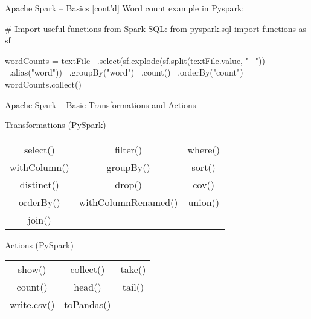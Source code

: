 \documentclass[ignorenonframetext,xcolor=x11names]{beamer}
\begin{document}


\begin{frame}[fragile]{Apache Spark -- Basics \small [cont'd]}
Word count example in Pyspark:
\begin{pythoncode}
# Import useful functions from Spark SQL:
from pyspark.sql import functions as sf

wordCounts = textFile \
    .select(sf.explode(sf.split(textFile.value, "\s+")) \
        .alias("word")) \
    .groupBy("word") \
    .count() \
    .orderBy("count")
wordCounts.collect()
\end{pythoncode}
\end{frame}

\begin{frame}{Apache Spark -- Basic Transformations and Actions}
\begin{block}{Transformations (PySpark)}
\centering
\renewcommand{\arraystretch}{1.5}
\begin{tabular}{ccc} 
select() & filter() & where() \\
withColumn() & groupBy() & sort() \\
distinct() & drop() & cov() \\
orderBy() & withColumnRenamed() & union() \\
join()  \\
\end{tabular}
\end{block}

\begin{block}{Actions (PySpark)}
\centering
\renewcommand{\arraystretch}{1.5}
\begin{tabular}{ccc} 
show() & collect() & take() \\
count() & head() & tail() \\
write.csv() & toPandas() & \\
\end{tabular}
\end{block}
\end{frame}
\end{document}
